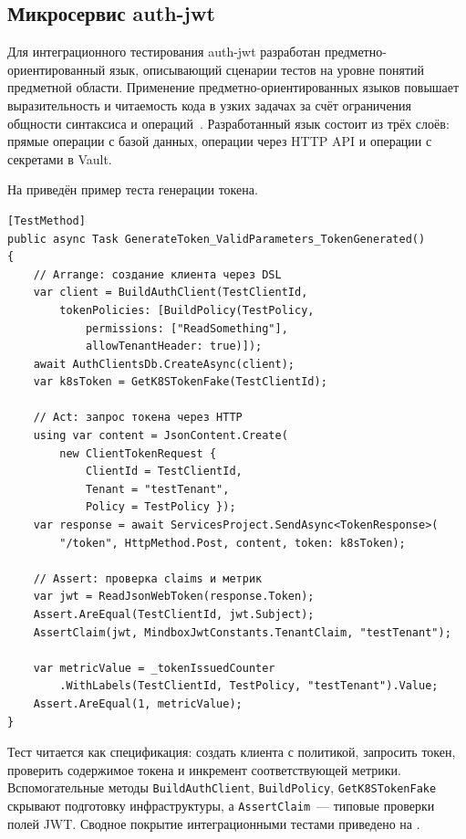 \subsection{Микросервис auth-jwt}\label{subsec:ch4-auth-jwt-tests}

Для интеграционного тестирования auth-jwt разработан
предметно-ориентированный язык, описывающий сценарии тестов
на уровне понятий предметной области.
Применение предметно-ориентированных языков повышает выразительность
и читаемость кода в узких задачах за счёт ограничения общности
синтаксиса и операций~\cite{Mernik2005DSL}.
Разработанный язык состоит из трёх слоёв:
прямые операции с базой данных,
операции через HTTP API
и операции с секретами в Vault.

На  приведён
пример теста генерации токена.

\begin{codeblock}
\begin{lstlisting}[language={[Sharp]C}]
[TestMethod]
public async Task GenerateToken_ValidParameters_TokenGenerated()
{
    // Arrange: создание клиента через DSL
    var client = BuildAuthClient(TestClientId,
        tokenPolicies: [BuildPolicy(TestPolicy,
            permissions: ["ReadSomething"],
            allowTenantHeader: true)]);
    await AuthClientsDb.CreateAsync(client);
    var k8sToken = GetK8STokenFake(TestClientId);

    // Act: запрос токена через HTTP
    using var content = JsonContent.Create(
        new ClientTokenRequest {
            ClientId = TestClientId,
            Tenant = "testTenant",
            Policy = TestPolicy });
    var response = await ServicesProject.SendAsync<TokenResponse>(
        "/token", HttpMethod.Post, content, token: k8sToken);

    // Assert: проверка claims и метрик
    var jwt = ReadJsonWebToken(response.Token);
    Assert.AreEqual(TestClientId, jwt.Subject);
    AssertClaim(jwt, MindboxJwtConstants.TenantClaim, "testTenant");

    var metricValue = _tokenIssuedCounter
        .WithLabels(TestClientId, TestPolicy, "testTenant").Value;
    Assert.AreEqual(1, metricValue);
}
\end{lstlisting}
\end{codeblock}

Тест читается как спецификация:
создать клиента с политикой,
запросить токен,
проверить содержимое токена и инкремент соответствующей метрики.
Вспомогательные методы \texttt{BuildAuthClient},
\texttt{BuildPolicy}, \texttt{GetK8STokenFake}
скрывают подготовку инфраструктуры,
а \texttt{AssertClaim}~--- типовые проверки полей JWT.
Сводное покрытие интеграционными тестами приведено
на .

